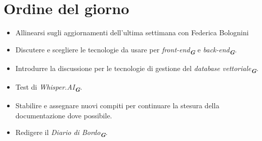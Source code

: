 

\section{Ordine del giorno}

\begin{itemize}
    \item Allinearsi sugli aggiornamenti dell'ultima settimana con Federica Bolognini
    \item Discutere e scegliere le tecnologie da usare per \emph{front-end}\textsubscript{\textit{\textbf{G}}} e \emph{back-end}\textsubscript{\textit{\textbf{G}}}.
    \item Introdurre la discussione per le tecnologie di gestione del \emph{database vettoriale}\textsubscript{\textit{\textbf{G}}}.
    \item Test di \emph{Whisper.AI}\textsubscript{\textit{\textbf{G}}}.
    \item Stabilire e assegnare nuovi compiti per continuare la stesura della documentazione dove possibile.
    \item Redigere il \emph{Diario di Bordo}\textsubscript{\textit{\textbf{G}}}.
\end{itemize}